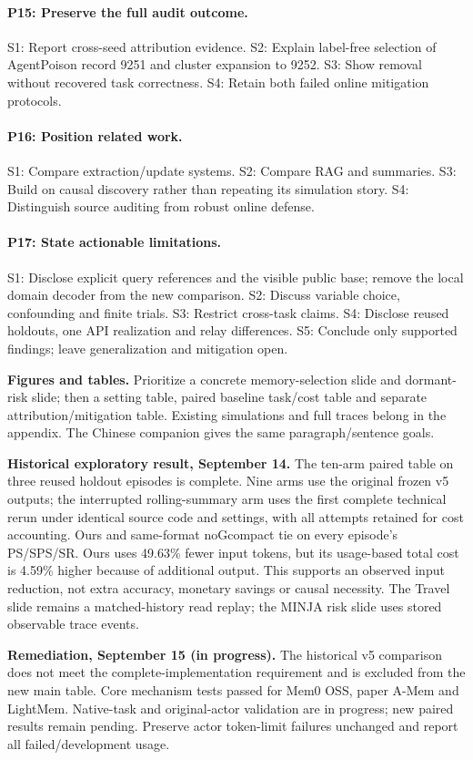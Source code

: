 \paragraph{P15: Preserve the full audit outcome.}
S1: Report cross-seed attribution evidence. S2: Explain label-free selection of
AgentPoison record 9251 and cluster expansion to 9252. S3: Show removal without
recovered task correctness. S4: Retain both failed online mitigation protocols.

\paragraph{P16: Position related work.}
S1: Compare extraction/update systems. S2: Compare RAG and summaries.
S3: Build on causal discovery rather than repeating its simulation story.
S4: Distinguish source auditing from robust online defense.

\paragraph{P17: State actionable limitations.}
S1: Disclose explicit query references and the visible public base; remove the
local domain decoder from the new comparison.
S2: Discuss variable choice, confounding and finite trials. S3: Restrict cross-task
claims. S4: Disclose reused holdouts, one API realization and relay differences.
S5: Conclude only supported findings; leave generalization and mitigation open.

\noindent\textbf{Figures and tables.} Prioritize a concrete memory-selection slide
and dormant-risk slide; then a setting table, paired baseline task/cost table and
separate attribution/mitigation table. Existing simulations and full traces belong
in the appendix. The Chinese companion gives the same paragraph/sentence goals.

\noindent\textbf{Historical exploratory result, September 14.} The ten-arm paired table on three
reused holdout episodes is complete. Nine arms use the original frozen v5 outputs;
the interrupted rolling-summary arm uses the first complete technical rerun under
identical source code and settings, with all attempts retained for cost accounting.
Ours and same-format noGcompact tie on every episode's PS/SPS/SR. Ours uses 49.63\%
fewer input tokens, but its usage-based total cost is 4.59\% higher because of
additional output. This supports an observed input reduction, not extra accuracy,
monetary savings or causal necessity. The Travel slide remains a matched-history
read replay; the MINJA risk slide uses stored observable trace events.

\noindent\textbf{Remediation, September 15 (in progress).} The historical v5
comparison does not meet the complete-implementation requirement and is excluded
from the new main table. Core mechanism tests passed for Mem0 OSS, paper A-Mem
and LightMem. Native-task and original-actor validation are in progress; new
paired results remain pending. Preserve actor token-limit failures unchanged and
report all failed/development usage.

